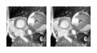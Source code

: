 \documentclass[xcolor=svgnames,handout]{beamer}
\begin{document}
\begin{frame}
\begin{itemize}
\begin{center}
    \includegraphics[width=50]{7.png}
    \hspace{0.15cm}
    \includegraphics[width=50]{9.png}
  \end{center}
  

\end{itemize}
\end{frame}
\end{document}
